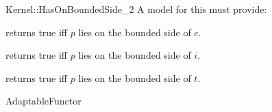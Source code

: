 \begin{ccRefFunctionObjectConcept}{Kernel::HasOnBoundedSide_2}
A model for this must provide:


{returns true iff $p$ lies on the bounded side of $c$.}

{returns true iff $p$ lies on the bounded side of $i$.}

{returns true iff $p$ lies on the bounded side of $t$.}

\ccRefines
AdaptableFunctor

\ccSeeAlso
{} \\
\\
\\

\end{ccRefFunctionObjectConcept}

